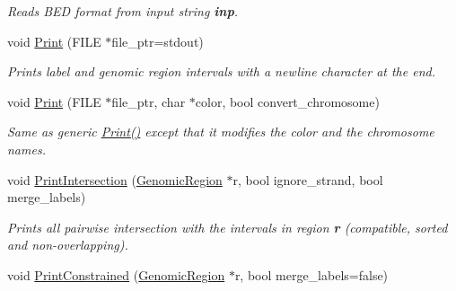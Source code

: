 \begin{CompactItemize}
\begin{CompactList}\small\item\em Reads BED format from input string {\bf inp}. \item\end{CompactList}\item 
\hypertarget{classGenomicRegionBED_ffbd8eb279f10f9b45189e2388fe7e89}{
void \hyperlink{classGenomicRegionBED_ffbd8eb279f10f9b45189e2388fe7e89}{Print} (FILE $\ast$file\_\-ptr=stdout)}
\label{classGenomicRegionBED_ffbd8eb279f10f9b45189e2388fe7e89}

\begin{CompactList}\small\item\em Prints label and genomic region intervals with a newline character at the end. \item\end{CompactList}\item 
\hypertarget{classGenomicRegionBED_e194ce2d67eafe222f10172ee376de94}{
void \hyperlink{classGenomicRegionBED_e194ce2d67eafe222f10172ee376de94}{Print} (FILE $\ast$file\_\-ptr, char $\ast$color, bool convert\_\-chromosome)}
\label{classGenomicRegionBED_e194ce2d67eafe222f10172ee376de94}

\begin{CompactList}\small\item\em Same as generic \hyperlink{classGenomicRegionBED_ffbd8eb279f10f9b45189e2388fe7e89}{Print()} except that it modifies the color and the chromosome names. \item\end{CompactList}\item 
\hypertarget{classGenomicRegionBED_04eceeb473bee498747bdd68d8ba8806}{
void \hyperlink{classGenomicRegionBED_04eceeb473bee498747bdd68d8ba8806}{PrintIntersection} (\hyperlink{classGenomicRegion}{GenomicRegion} $\ast$r, bool ignore\_\-strand, bool merge\_\-labels)}
\label{classGenomicRegionBED_04eceeb473bee498747bdd68d8ba8806}

\begin{CompactList}\small\item\em Prints all pairwise intersection with the intervals in region {\bf r} (compatible, sorted and non-overlapping). \item\end{CompactList}\item 
\hypertarget{classGenomicRegionBED_25a8584259b6a8d47aa8c46795de1880}{
void \hyperlink{classGenomicRegionBED_25a8584259b6a8d47aa8c46795de1880}{PrintConstrained} (\hyperlink{classGenomicRegion}{GenomicRegion} $\ast$r, bool merge\_\-labels=false)}
\label{classGenomicRegionBED_25a8584259b6a8d47aa8c46795de1880}


\end{CompactItemize}
